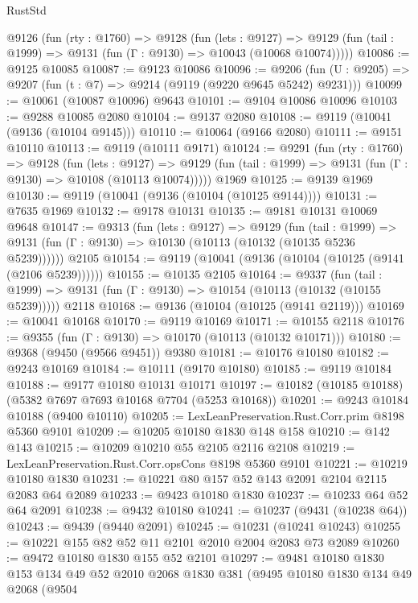 \begin{lexlean}{RustStd}
\begin{coremodule}
  @9126
    (fun (rty : @1760) =>
    @9128
      (fun (lets : @9127) =>
      @9129 (fun (tail : @1999) => @9131 (fun (Γ : @9130) => @10043 (@10068 @10074)))))
@10086 := @9125 @10085
@10087 := @9123 @10086
@10096 := @9206 (fun (U : @9205) => @9207 (fun (t : @7) => @9214 (@9119 (@9220 @9645 @5242) @9231)))
@10099 := @10061 (@10087 @10096) @9643
@10101 := @9104 @10086 @10096
@10103 := @9288 @10085 @2080
@10104 := @9137 @2080
@10108 := @9119 (@10041 (@9136 (@10104 @9145)))
@10110 := @10064 (@9166 @2080)
@10111 := @9151 @10110
@10113 := @9119 (@10111 @9171)
@10124 := @9291
    (fun (rty : @1760) =>
    @9128
      (fun (lets : @9127) =>
      @9129 (fun (tail : @1999) => @9131 (fun (Γ : @9130) => @10108 (@10113 @10074)))))
    @1969
@10125 := @9139 @1969
@10130 := @9119 (@10041 (@9136 (@10104 (@10125 @9144))))
@10131 := @7635 @1969
@10132 := @9178 @10131
@10135 := @9181 @10131 @10069 @9648
@10147 := @9313
    (fun (lets : @9127) =>
    @9129
      (fun (tail : @1999) =>
      @9131 (fun (Γ : @9130) => @10130 (@10113 (@10132 (@10135 @5236 @5239))))))
    @2105
@10154 := @9119 (@10041 (@9136 (@10104 (@10125 (@9141 (@2106 @5239))))))
@10155 := @10135 @2105
@10164 := @9337
    (fun (tail : @1999) => @9131 (fun (Γ : @9130) => @10154 (@10113 (@10132 (@10155 @5239)))))
    @2118
@10168 := @9136 (@10104 (@10125 (@9141 @2119)))
@10169 := @10041 @10168
@10170 := @9119 @10169
@10171 := @10155 @2118
@10176 := @9355 (fun (Γ : @9130) => @10170 (@10113 (@10132 @10171)))
@10180 := @9368 (@9450 (@9566 @9451)) @9380
@10181 := @10176 @10180
@10182 := @9243 @10169
@10184 := @10111 (@9170 @10180)
@10185 := @9119 @10184
@10188 := @9177 @10180 @10131 @10171
@10197 := @10182 (@10185 @10188) (@5382 @7697 @7693 @10168 @7704 (@5253 @10168))
@10201 := @9243 @10184 @10188 (@9400 @10110)
@10205 := LexLeanPreservation.Rust.Corr.prim @8198 @5360 @9101
@10209 := @10205 @10180 @1830 @148 @158
@10210 := @142 @143
@10215 := @10209 @10210 @55 @2105 @2116 @2108
@10219 := LexLeanPreservation.Rust.Corr.opsCons @8198 @5360 @9101
@10221 := @10219 @10180 @1830
@10231 := @10221 @80 @157 @52 @143 @2091 @2104 @2115 @2083 @64 @2089
@10233 := @9423 @10180 @1830
@10237 := @10233 @64 @52 @64 @2091
@10238 := @9432 @10180
@10241 := @10237 (@9431 (@10238 @64))
@10243 := @9439 (@9440 @2091)
@10245 := @10231 (@10241 @10243)
@10255 := @10221 @155 @82 @52 @11 @2101 @2010 @2004 @2083 @73 @2089
@10260 := @9472 @10180 @1830 @155 @52 @2101
@10297 := @9481
    @10180
    @1830
    @153
    @134
    @49
    @52
    @2010
    @2068
    @1830
    @381
    (@9495
      @10180
      @1830
      @134
      @49
      @2068
      (@9504

\end{coremodule}
\end{lexlean}
